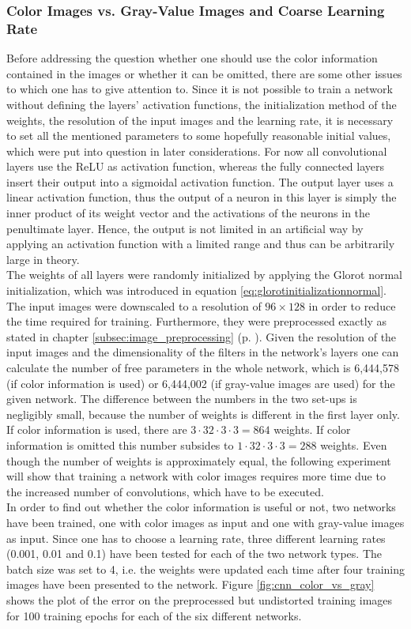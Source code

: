 \documentclass[11pt, a4paper]{article}
\newcommand\myref[1]{\ref{#1} (p. \pageref{#1})}
\begin{document}
\subsubsection{Color Images vs. Gray-Value Images and Coarse Learning Rate}
\label{subsubsec:color_gray_learningrate}

Before addressing the question whether one should use the color information contained in the images or whether it can be omitted, there are some other issues to which one has to give attention to. Since it is not possible to train a network without defining the layers' activation functions, the initialization method of the weights, the resolution of the input images and the learning rate, it is necessary to set all the mentioned parameters to some hopefully reasonable initial values, which were put into question in later considerations. For now all convolutional layers use the \ac{ReLU} as activation function, whereas the fully connected layers insert their output into a sigmoidal activation function. The output layer uses a linear activation function, thus the output of a neuron in this layer is simply the inner product of its weight vector and the activations of the neurons in the penultimate layer. Hence, the output is not limited in an artificial way by applying an activation function with a limited range and thus can be arbitrarily large in theory.\\
The weights of all layers were randomly initialized by applying the Glorot normal initialization, which was introduced in equation \eqref{eq:glorotinitializationnormal}. The input images were downscaled to a resolution of $96\times128$ in order to reduce the time required for training. Furthermore, they were preprocessed exactly as stated in chapter \myref{subsec:image_preprocessing}. Given the resolution of the input images and the dimensionality of the filters in the network's layers one can calculate the number of free parameters in the whole network, which is 6,444,578 (if color information is used) or 6,444,002 (if gray-value images are used) for the given network. The difference between the numbers in the two set-ups is negligibly small, because the number of weights is different in the first layer only. If color information is used, there are $3\cdot32\cdot3\cdot3 = 864$ weights. If color information is omitted this number subsides to $1\cdot32\cdot3\cdot3 = 288$ weights. Even though the number of weights is approximately equal, the following experiment will show that training a network with color images requires more time due to the increased number of convolutions, which have to be executed.\\
In order to find out whether the color information is useful or not, two networks have been trained, one with color images as input and one with gray-value images as input. Since one has to choose a learning rate, three different learning rates (0.001, 0.01 and 0.1) have been tested for each of the two network types. The batch size was set to 4, i.e. the weights were updated each time after four training images have been presented to the network. Figure \ref{fig:cnn_color_vs_gray} shows the plot of the error on the preprocessed but undistorted training images for 100 training epochs for each of the six different networks.
\end{document}
